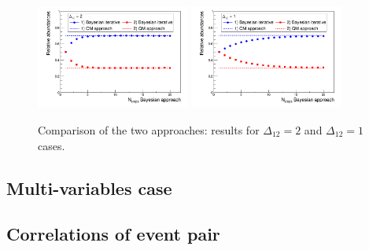 \begin{figure}[!htb]
\centering
\includegraphics[width=0.45\textwidth]{../png/figIterativeDelta2.png}
\includegraphics[width=0.45\textwidth]{../png/figIterativeDelta1.png}
\caption{Comparison of the two approaches: results for $\Delta_{12} = 2$ and
  $\Delta_{12} = 1$ cases.}
\label{fig:IterGaus2}
\end{figure}

\subsection{Multi-variables case}

\subsection{Correlations of event pair}

